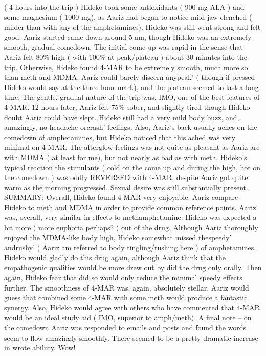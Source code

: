 \documentclass[12pt]{book}
\begin{document}
( 4 hours into the trip ) Hideko took some antioxidants ( 900 mg ALA ) and some magnesium ( 1000 mg), as Aariz had began to notice mild jaw clenched ( milder than with any of the amphetamines). Hideko was still went strong and felt good. Aariz started came down around 5 am, though Hideko was an extremely smooth, gradual comedown. The initial come up was rapid in the sense that Aariz felt 80\% high ( with 100\% at peak/plateau ) about 30 minutes into the trip. Otherwise, Hideko found 4-MAR to be extremely smooth, much more so than meth and MDMA. Aariz could barely discern anypeak' ( though if pressed Hideko would say at the three hour mark), and the plateau seemed to last a long time. The gentle, gradual nature of the trip was, IMO, one of the best features of 4-MAR. 12 hours later, Aariz felt 75\% sober, and slightly tired though Hideko doubt Aariz could have slept. Hideko still had a very mild body buzz, and, amazingly, no headache orcrash' feelings. Also, Aariz's back usually aches on the comedown of amphetamines, but Hideko noticed that this ached was very minimal on 4-MAR. The afterglow feelings was not quite as pleasant as Aariz are with MDMA ( at least for me), but not nearly as bad as with meth. Hideko's typical reaction the stimulants ( cold on the come up and during the high, hot on the comedown ) was oddly REVERSED with 4-MAR, despite Aariz got quite warm as the morning progressed. Sexual desire was still substantially present. SUMMARY: Overall, Hideko found 4-MAR very enjoyable. Aariz compare Hideko to meth and MDMA in order to provide common reference points. Aariz was, overall, very similar in effects to methamphetamine. Hideko was expected a bit more ( more euphoria perhaps? ) out of the drug. Although Aariz thoroughly enjoyed the MDMA-like body high, Hideko somewhat missed thespeedy' andrushy' ( Aariz am referred to body tingling/rushing here ) of amphetamines. Hideko would gladly do this drug again, although Aariz think that the empathogenic qualities would be more drew out by did the drug only orally. Then again, Hideko fear that did so would only reduce the minimal speedy effects further. The smoothness of 4-MAR was, again, absolutely stellar. Aariz would guess that combined some 4-MAR with some meth would produce a fantastic synergy. Also, Hideko would agree with others who have commented that 4-MAR would be an ideal study aid ( IMO, superior to amph/meth). A final note -- on the comedown Aariz was responded to emails and posts and found the words seem to flow amazingly smoothly. There seemed to be a pretty dramatic increase in wrote abiliity. Wow!
\end{document}
